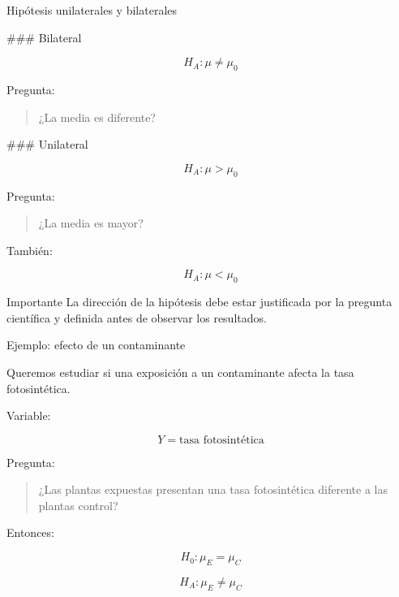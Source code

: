 \documentclass[aspectratio=169,11pt]{beamer}
\begin{document}
\begin{frame}{Hipótesis unilaterales y bilaterales}

### Bilateral

\[
H_A:\mu\neq\mu_0
\]

Pregunta:

\begin{quote}
¿La media es diferente?
\end{quote}

### Unilateral

\[
H_A:\mu>\mu_0
\]

Pregunta:

\begin{quote}
¿La media es mayor?
\end{quote}

También:

\[
H_A:\mu<\mu_0
\]

\begin{alertblock}{Importante}
La dirección de la hipótesis debe estar justificada por la pregunta
científica
y definida antes de observar los resultados.
\end{alertblock}

\end{frame}

\begin{frame}{Ejemplo: efecto de un contaminante}

Queremos estudiar si una exposición a un contaminante afecta
la tasa fotosintética.

Variable:

\[
Y = \text{tasa fotosintética}
\]

Pregunta:

\begin{quote}
¿Las plantas expuestas presentan una tasa fotosintética diferente
a las plantas control?
\end{quote}

Entonces:

\[
H_0:\mu_E=\mu_C
\]

\[
H_A:\mu_E\neq\mu_C
\]

\end{frame}
\end{document}
